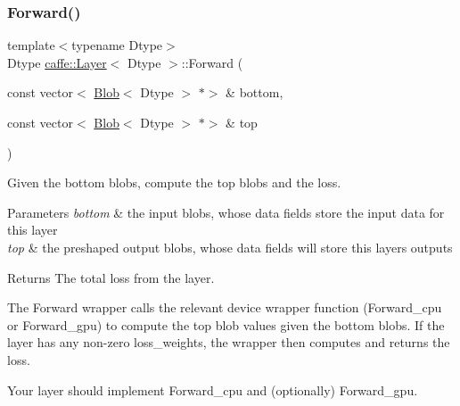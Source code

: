 \subsubsection{\texorpdfstring{Forward()}{Forward()}\hspace{0.1cm}{\footnotesize\ttfamily [1/2]}}
{\footnotesize\ttfamily template$<$typename Dtype$>$ \\
Dtype \mbox{\hyperlink{classcaffe_1_1_layer}{caffe\+::\+Layer}}$<$ Dtype $>$\+::Forward (\begin{DoxyParamCaption}\item[{const vector$<$ \mbox{\hyperlink{classcaffe_1_1_blob}{Blob}}$<$ Dtype $>$ $\ast$$>$ \&}]{bottom,  }\item[{const vector$<$ \mbox{\hyperlink{classcaffe_1_1_blob}{Blob}}$<$ Dtype $>$ $\ast$$>$ \&}]{top }\end{DoxyParamCaption})\hspace{0.3cm}{\ttfamily [inline]}}



Given the bottom blobs, compute the top blobs and the loss. 


\begin{DoxyParams}{Parameters}
{\em bottom} & the input blobs, whose data fields store the input data for this layer \\
\hline
{\em top} & the preshaped output blobs, whose data fields will store this layers\textquotesingle{} outputs \\
\hline
\end{DoxyParams}
\begin{DoxyReturn}{Returns}
The total loss from the layer.
\end{DoxyReturn}
The Forward wrapper calls the relevant device wrapper function (Forward\+\_\+cpu or Forward\+\_\+gpu) to compute the top blob values given the bottom blobs. If the layer has any non-\/zero loss\+\_\+weights, the wrapper then computes and returns the loss.

Your layer should implement Forward\+\_\+cpu and (optionally) Forward\+\_\+gpu. \mbox{\label{classcaffe_1_1_layer_ab57d272dabe8c709d2a785eebe72ca57}} 
